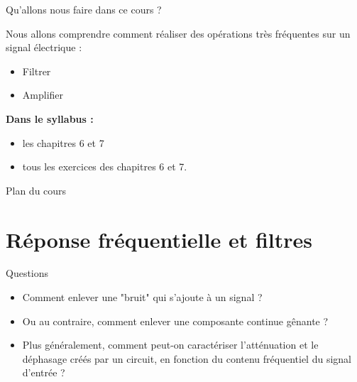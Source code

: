 \titleframe



\begin{frame}{Qu'allons nous faire dans ce cours ?}
	
	Nous allons comprendre comment réaliser des opérations très fréquentes sur un signal électrique : 
	\begin{itemize}
	\item Filtrer 
	\item Amplifier
	\end{itemize}
	
	\vfill 
	\textbf{Dans le syllabus : }
	\begin{itemize}
		\item les chapitres 6 et 7
		\item tous les exercices des chapitres 6 et 7.
	\end{itemize}
	
	
\end{frame}


\begin{frame}{Plan du cours}
	\tableofcontents[hideallsubsections]
\end{frame}



\section{Réponse fréquentielle et filtres}

\begin{frame}{Questions}

	\begin{itemize}
		\item Comment enlever une "bruit" qui s'ajoute à un signal ?
		\item Ou au contraire, comment enlever une composante continue gênante ?
		\item Plus généralement, comment peut-on caractériser l'atténuation et le déphasage créés par un circuit, en fonction du contenu fréquentiel du signal d'entrée ?
	\end{itemize}


\end{frame}

